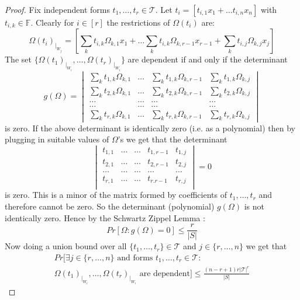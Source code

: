 \documentclass[12pt]{caltech_thesis}
\theoremstyle{plain}
\theoremstyle{definition}
\newcommand{\F}{\mathbb{F}}
\newcommand{\MT}{\mathcal{T}}
\begin{document}
\begin{proof}
Fix independent forms $t_1,\ldots,t_r \in \MT$. Let $t_i = [t_{i,1}x_1+\ldots t_{i,n}x_n]$ with $t_{i,k}\in \F$. 
Clearly for $i\in [r]$ the restrictions of $\Omega(t_i)$ are: 
\[\Omega(t_i)_{|_{W_j}} = [\sum\limits_k t_{i,k}\Omega_{k,1}x_1 + \ldots \sum\limits_k t_{i,k}\Omega_{k,r-1}x_{r-1}
+\sum\limits_k t_{i,j}\Omega_{k,j}x_j]\]
The set $\{\Omega(t_1)_{|_{W_i}},\ldots,\Omega(t_{r})_{|_{W_i}}\}$ are dependent if and only if the determinant
\[
  g(\Omega)= \begin{vmatrix}
\sum\limits_k t_{1,k}\Omega_{k,1} & \ldots & \sum\limits_k t_{1,k}\Omega_{k,r-1} & \sum\limits_k t_{1,k}\Omega_{k,j} \\
\sum\limits_k t_{2,k}\Omega_{k,1} & \ldots & \sum\limits_k t_{2,k}\Omega_{k,r-1} & \sum\limits_k t_{2,k}\Omega_{k,j} \\
\ldots & \ldots & \ldots & \ldots \\
\ldots & \ldots & \ldots & \ldots \\
\sum\limits_k t_{r,k}\Omega_{k,1} & \ldots & \sum\limits_k t_{r,k}\Omega_{k,r-1} & \sum\limits_k t_{r,k}\Omega_{k,j} 
\end{vmatrix}
 \]
 is zero. If the above determinant is identically zero (i.e. as a polynomial) then by plugging in suitable values of $\Omega$'s we get that the 
 determinant
 \[
 \begin{vmatrix}
  t_{1,1} & \ldots & \ldots &t_{1,r-1}  & t_{1,j}\\
  t_{2,1} & \ldots & \ldots& t_{2,r-1} & t_{2,j}\\
  \ldots & \ldots & \ldots&\ldots &\ldots\\
  t_{r,1} & \ldots & \ldots & t_{r.r-1} & t_{r,j}\\
 \end{vmatrix} =0
 \]
 is zero. This is a minor of the matrix formed by coefficients of $t_1,\ldots,t_r$ and therefore cannot be zero.
So the determinant (polynomial) $g(\Omega)$ is not identically zero.
Hence by the Schwartz Zippel Lemma :
\begin{equation}\nonumber
 Pr[ \Omega :g(\Omega)=0 ] \leq \frac{r}{|S|}
\end{equation}
Now doing a union bound over all $\{t_1,\ldots,t_r\} \in \MT$ and $j\in \{r,\ldots,n\}$ we get that 
 \begin{multline}\nonumber
  Pr[ \exists j\in \{r,\ldots,n\} \text{ and forms } t_1,\ldots,t_r  \in \MT : \\\Omega(t_1)_{|_{W_i}},\ldots,\Omega(t_r)_{|_{W_i}} 
  \text{ are dependent}] \leq\frac{(n-r+1)r|\MT|^r}{|S|}	
  \end{multline}

\end{proof}
\end{document}
